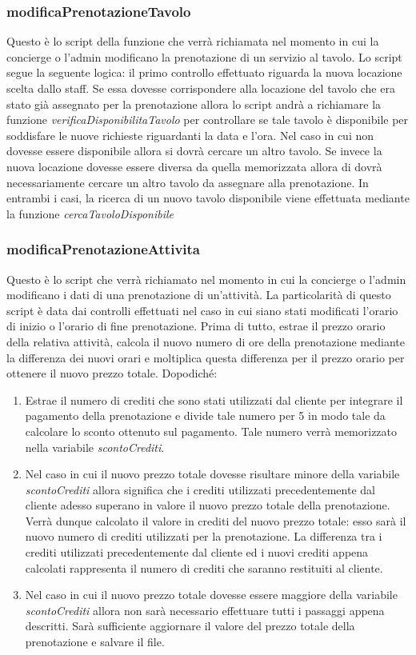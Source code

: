 \documentclass [a4paper, 12pt]{book}
\begin{document}
\subsubsection{modificaPrenotazioneTavolo}
Questo è lo script della funzione che verrà richiamata nel momento in cui la concierge o l'admin modificano la prenotazione di un servizio al tavolo. Lo script segue la seguente logica: il primo controllo effettuato riguarda la nuova locazione scelta dallo staff. Se essa dovesse corrispondere alla locazione del tavolo che era stato già assegnato per la prenotazione allora lo script andrà a richiamare la funzione \textit{verificaDisponibilitaTavolo} per controllare se tale tavolo è disponibile per soddisfare le nuove richieste riguardanti la data e l'ora. Nel caso in cui non dovesse essere disponibile allora si dovrà cercare un altro tavolo. Se invece la nuova locazione dovesse essere diversa da quella memorizzata allora di dovrà necessariamente cercare un altro tavolo da assegnare alla prenotazione. In entrambi i casi, la ricerca di un nuovo tavolo disponibile viene effettuata mediante la funzione \textit{cercaTavoloDisponibile}


\subsubsection{modificaPrenotazioneAttivita}
Questo è lo script che verrà richiamato nel momento in cui la concierge o l'admin modificano i dati di una prenotazione di un'attività. La particolarità di questo script è data dai controlli effettuati nel caso in cui siano stati modificati l'orario di inizio o l'orario di fine prenotazione. Prima di tutto, estrae il prezzo orario della relativa attività, calcola il nuovo numero di ore della prenotazione mediante la differenza dei nuovi orari e moltiplica questa differenza per il prezzo orario per ottenere il nuovo prezzo totale. Dopodiché:
\begin{enumerate}
\item Estrae il numero di crediti che sono stati utilizzati dal cliente per integrare il pagamento della prenotazione e divide tale numero per 5 in modo tale da calcolare lo sconto ottenuto sul pagamento. Tale numero verrà memorizzato nella variabile \textit{scontoCrediti}.
\item Nel caso in cui il nuovo prezzo totale dovesse risultare minore della variabile \textit{scontoCrediti} allora significa che i crediti utilizzati precedentemente dal cliente adesso superano in valore il nuovo prezzo totale della prenotazione. Verrà dunque calcolato il valore in crediti del nuovo prezzo totale: esso sarà il nuovo numero di crediti utilizzati per la prenotazione. La differenza tra i crediti utilizzati precedentemente dal cliente ed i nuovi crediti appena calcolati rappresenta il numero di crediti che saranno restituiti al cliente.
\item Nel caso in cui il nuovo prezzo totale dovesse essere maggiore della variabile \textit{scontoCrediti} allora non sarà necessario effettuare tutti i passaggi appena descritti. Sarà sufficiente aggiornare il valore del prezzo totale della prenotazione e salvare il file.
\end{enumerate}
 
\end{document}
